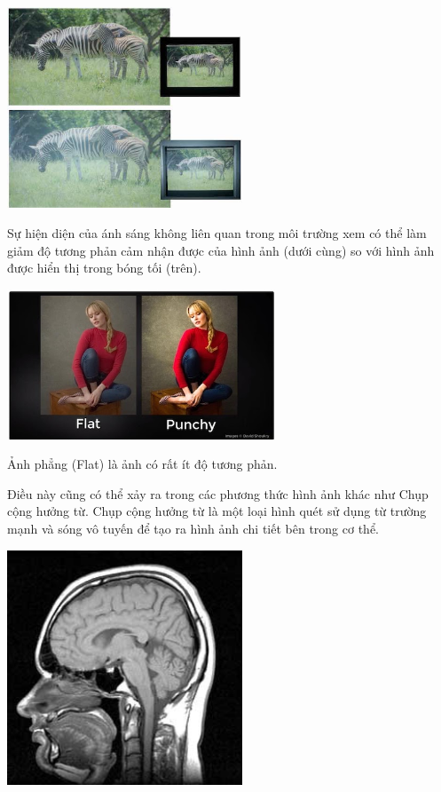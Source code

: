 \documentclass[12pt,letterpaper]{report}
\begin{document}
\begin{center}
	\includegraphics[width=7cm]{image1.jpg}
\end{center}
	
Sự hiện diện của ánh sáng không liên quan trong môi trường xem có thể làm giảm độ tương phản cảm nhận được của hình ảnh (dưới cùng) so với hình ảnh được hiển thị trong bóng tối (trên).
    
\begin{center}
	\includegraphics[width=8cm]{image2.jpg}
\end{center}
    
Ảnh phẳng (Flat) là ảnh có rất ít độ tương phản.
    
Điều này cũng có thể xảy ra trong các phương thức hình ảnh khác như Chụp cộng hưởng từ. Chụp cộng hưởng từ là một loại hình quét sử dụng từ trường mạnh và sóng vô tuyến để tạo ra hình ảnh chi tiết bên trong cơ thể.
    
\begin{center}
	\includegraphics[width=7cm]{image3.jpg}
\end{center}
	
\end{document}
